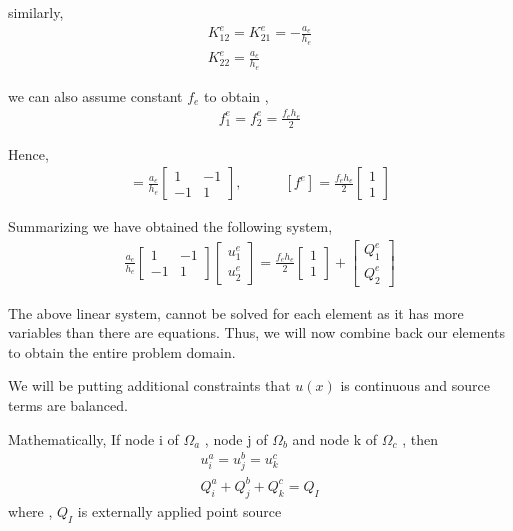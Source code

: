 similarly,
\begin{eqnarray}
	 K_{12}^e = K_{21}^e = -\frac{a_e}{h_e}\\
	 K_{22}^e = \frac{a_e}{h_e}
\end{eqnarray}

we can also assume constant $f_e$ to obtain ,
\begin{eqnarray}
	f_{1}^e = 	f_{2}^e = \frac{f_e h_e}{2}
\end{eqnarray}

Hence,
\begin{eqnarray}
	[K^e] = \frac{a_e}{h_e}
	\begin{bmatrix}
		1 & -1\\
		-1 & 1
	\end{bmatrix},\quad\quad\quad
	[f^e] = \frac{f_e h_e}{2}
\begin{bmatrix}
	1 \\
	1
\end{bmatrix}
\end{eqnarray}

Summarizing we have obtained the following system,
\begin{eqnarray}\label{system1}
	\frac{a_e}{h_e}
	\begin{bmatrix}
		1 & -1\\
		-1 & 1
	\end{bmatrix}
\begin{bmatrix}
	u_1^e \\
	u_2^e
\end{bmatrix}
 = \frac{f_e h_e}{2}
\begin{bmatrix}
	1 \\
	1
\end{bmatrix} + 
\begin{bmatrix}
	Q_1^e \\
	Q_2^e
\end{bmatrix}
\end{eqnarray}

The above linear system, cannot be solved for each element as it has more variables than there are equations. Thus, we will now combine back our elements to obtain the entire problem domain.

We will be putting additional constraints that $u(x)$ is continuous and source terms are balanced.

Mathematically, If node i of $\Omega_a$ , node j of $\Omega_b$ and  node k of $\Omega_c$ , then 
\begin{eqnarray}
	u_i^a = u_j^b = u_k^c\\
	Q_i^a + Q_j^b + Q_k^c = Q_I
\end{eqnarray}
where , $Q_I$ is externally applied point source

